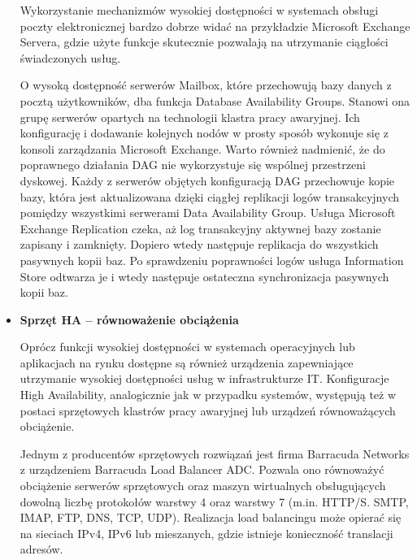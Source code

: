 \documentclass[12pt]{article}
\renewcommand{\_}{\kern-1.5pt\textunderscore\kern-1.5pt}
\begin{document}
\begin{itemize}
Wykorzystanie mechanizmów wysokiej dostępności w systemach obsługi poczty elektronicznej bardzo dobrze widać na przykładzie Microsoft Exchange Servera, gdzie użyte funkcje skutecznie pozwalają na utrzymanie ciągłości świadczonych usług.\par


\vspace{\baselineskip}
O wysoką dostępność serwerów Mailbox, które przechowują bazy danych z pocztą użytkowników, dba funkcja Database Availability Groups. Stanowi ona grupę serwerów opartych na technologii klastra pracy awaryjnej. Ich konfigurację i dodawanie kolejnych nodów w prosty sposób wykonuje się z konsoli zarządzania Microsoft Exchange. Warto również nadmienić, że do poprawnego działania DAG nie wykorzystuje się wspólnej przestrzeni dyskowej. Każdy z serwerów objętych konfiguracją DAG przechowuje kopie bazy, która jest aktualizowana dzięki ciągłej replikacji logów transakcyjnych pomiędzy wszystkimi serwerami Data Availability Group. Usługa Microsoft Exchange Replication czeka, aż log transakcyjny aktywnej bazy zostanie zapisany i zamknięty. Dopiero wtedy następuje replikacja do wszystkich pasywnych kopii baz. Po sprawdzeniu poprawności logów usługa Information Store odtwarza je i wtedy następuje ostateczna synchronizacja pasywnych kopii baz.\par

	\item \textbf{Sprzęt HA – równoważenie obciążenia}\par

Oprócz funkcji wysokiej dostępności w systemach operacyjnych lub aplikacjach na rynku dostępne są również urządzenia zapewniające utrzymanie wysokiej dostępności usług w infrastrukturze IT. Konfiguracje High Availability, analogicznie jak w przypadku systemów, występują też w postaci sprzętowych klastrów pracy awaryjnej lub urządzeń równoważących obciążenie.\par


\vspace{\baselineskip}
Jednym z producentów sprzętowych rozwiązań jest firma Barracuda Networks z urządzeniem Barracuda Load Balancer ADC. Pozwala ono równoważyć obciążenie serwerów sprzętowych oraz maszyn wirtualnych obsługujących dowolną liczbę protokołów warstwy 4 oraz warstwy 7 (m.in. HTTP/S. SMTP, IMAP, FTP, DNS, TCP, UDP). Realizacja load balancingu może opierać się na sieciach IPv4, IPv6 lub mieszanych, gdzie istnieje konieczność translacji adresów.\par


\end{itemize}
\end{document}
